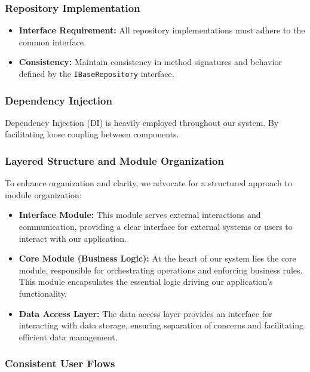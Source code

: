 \subsubsection{Repository Implementation}

\begin{itemize}[label=$\bullet$]
  \item \textbf{Interface Requirement:} All repository implementations must adhere to the common interface.
  \item \textbf{Consistency:} Maintain consistency in method signatures and behavior defined by the \texttt{IBaseRepository} interface.
\end{itemize}

\subsubsection{Dependency Injection}

Dependency Injection (DI) is heavily employed throughout our system. By facilitating loose coupling between components.

\subsubsection{ Layered Structure and Module Organization}

To enhance organization and clarity, we advocate for a structured approach to module organization:

\begin{itemize}[label=$\bullet$]
  \item \textbf{Interface Module:} This module serves external interactions and communication, providing a clear interface for external systems or users to interact with our application.

  \item \textbf{Core Module (Business Logic):} At the heart of our system lies the core module, responsible for orchestrating operations and enforcing business rules. This module encapsulates the essential logic driving our application's functionality.

  \item \textbf{Data Access Layer:} The data access layer provides an interface for interacting with data storage, ensuring separation of concerns and facilitating efficient data management.
\end{itemize}

\subsubsection{Consistent User Flows}

